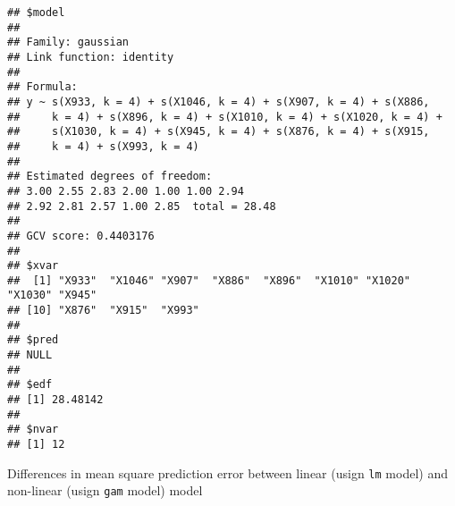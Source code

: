 \documentclass[
]{book}
\newenvironment{Shaded}{\begin{snugshade}}{\end{snugshade}}
\newcommand{\AttributeTok}[1]{\textcolor[rgb]{0.77,0.63,0.00}{#1}}
\newcommand{\CommentTok}[1]{\textcolor[rgb]{0.56,0.35,0.01}{\textit{#1}}}
\newcommand{\ControlFlowTok}[1]{\textcolor[rgb]{0.13,0.29,0.53}{\textbf{#1}}}
\newcommand{\DecValTok}[1]{\textcolor[rgb]{0.00,0.00,0.81}{#1}}
\newcommand{\FloatTok}[1]{\textcolor[rgb]{0.00,0.00,0.81}{#1}}
\newcommand{\FunctionTok}[1]{\textcolor[rgb]{0.00,0.00,0.00}{#1}}
\newcommand{\NormalTok}[1]{#1}
\newcommand{\OtherTok}[1]{\textcolor[rgb]{0.56,0.35,0.01}{#1}}
\newcommand{\SpecialCharTok}[1]{\textcolor[rgb]{0.00,0.00,0.00}{#1}}
\newcommand{\StringTok}[1]{\textcolor[rgb]{0.31,0.60,0.02}{#1}}
\begin{document}
\begin{Shaded}
\end{Shaded}

\begin{verbatim}
## $model
## 
## Family: gaussian 
## Link function: identity 
## 
## Formula:
## y ~ s(X933, k = 4) + s(X1046, k = 4) + s(X907, k = 4) + s(X886, 
##     k = 4) + s(X896, k = 4) + s(X1010, k = 4) + s(X1020, k = 4) + 
##     s(X1030, k = 4) + s(X945, k = 4) + s(X876, k = 4) + s(X915, 
##     k = 4) + s(X993, k = 4)
## 
## Estimated degrees of freedom:
## 3.00 2.55 2.83 2.00 1.00 1.00 2.94 
## 2.92 2.81 2.57 1.00 2.85  total = 28.48 
## 
## GCV score: 0.4403176     
## 
## $xvar
##  [1] "X933"  "X1046" "X907"  "X886"  "X896"  "X1010" "X1020" "X1030" "X945" 
## [10] "X876"  "X915"  "X993" 
## 
## $pred
## NULL
## 
## $edf
## [1] 28.48142
## 
## $nvar
## [1] 12
\end{verbatim}

Differences in mean square prediction error between linear (usign \texttt{lm} model) and non-linear (usign \texttt{gam} model) model

\begin{Shaded}
\end{Shaded}
\end{document}
